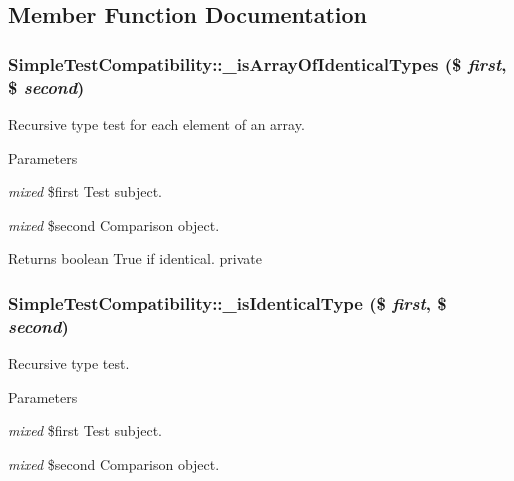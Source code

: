 \subsection{Member Function Documentation}
\hypertarget{class_simple_test_compatibility_aa6953a935c28d4f336281526758423a9}{
\subsubsection[{\_\-isArrayOfIdenticalTypes}]{\setlength{\rightskip}{0pt plus 5cm}SimpleTestCompatibility::\_\-isArrayOfIdenticalTypes (\$ {\em first}, \/  \$ {\em second})}}
\label{class_simple_test_compatibility_aa6953a935c28d4f336281526758423a9}
Recursive type test for each element of an array. 
\begin{DoxyParams}{Parameters}
\item[{\em mixed}]\$first Test subject. \item[{\em mixed}]\$second Comparison object. \end{DoxyParams}
\begin{DoxyReturn}{Returns}
boolean True if identical.  private 
\end{DoxyReturn}
\hypertarget{class_simple_test_compatibility_af12848db8e702fdc94ff39c09f57c226}{
\subsubsection[{\_\-isIdenticalType}]{\setlength{\rightskip}{0pt plus 5cm}SimpleTestCompatibility::\_\-isIdenticalType (\$ {\em first}, \/  \$ {\em second})}}
\label{class_simple_test_compatibility_af12848db8e702fdc94ff39c09f57c226}
Recursive type test. 
\begin{DoxyParams}{Parameters}
\item[{\em mixed}]\$first Test subject. \item[{\em mixed}]\$second Comparison object. \end{DoxyParams}
